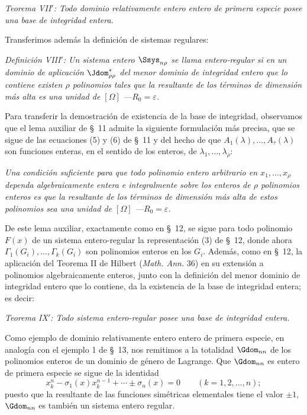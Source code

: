 \documentclass[11pt]{article}
\newcommand{\eps}{\varepsilon}
\begin{document}
\emph{Teorema VII$'$: Todo dominio relativamente entero entero de primera especie posee una base de integridad entera.}

Transferimos además la definición de sistemas regulares:

\emph{Definición VIII$'$: Un sistema entero $\Ssys_{n\rho}$ se llama entero-regular si en un dominio de aplicación $\Jdom^*_{\rho\rho}$ del menor dominio de integridad entero que lo contiene existen $\rho$ polinomios tales que la resultante de los términos de dimensión más alta es una unidad de $[\Omega]$ ---$R_0=\eps$.}

Para transferir la demostración de existencia de la base de integridad, observamos que el lema auxiliar de \S\ 11 admite la siguiente formulación más precisa, que se sigue de las ecuaciones (5) y (6) de \S\ 11 y del hecho de que $A_1(\lambda),\ldots,A_\tau(\lambda)$ son funciones enteras, en el sentido de los enteros, de $\lambda_1,\ldots,\lambda_\rho$:

\emph{Una condición suficiente para que todo polinomio entero arbitrario en $x_1,\ldots,x_\rho$ dependa algebraicamente entera e integralmente sobre los enteros de $\rho$ polinomios enteros es que la resultante de los términos de dimensión más alta de estos polinomios sea una unidad de $[\Omega]$ ---$R_0=\eps$.}

De este lema auxiliar, exactamente como en \S\ 12, se sigue para todo polinomio $F(x)$ de un sistema entero-regular la representación (3) de \S\ 12, donde ahora $\Gamma_1(G_i),\ldots,\Gamma_k(G_i)$ son polinomios enteros en los $G_i$. Además, como en \S\ 12, la aplicación del Teorema II de Hilbert (\emph{Math. Ann.} 36) en su extensión a polinomios algebraicamente enteros, junto con la definición del menor dominio de integridad entero que lo contiene, da la existencia de la base de integridad entera; es decir:

\emph{Teorema IX$'$: Todo sistema entero-regular posee una base de integridad entera.}

Como ejemplo de dominio relativamente entero entero de primera especie, en analogía con el ejemplo 1 de \S\ 13, nos remitimos a la totalidad $\Gdom_{nn}$ de los polinomios enteros de un dominio de género de Lagrange. Que $\Gdom_{nn}$ es entero de primera especie se sigue de la identidad
\[
  x_k^n-\sigma_1(x)x_k^{n-1}+\cdots\pm\sigma_n(x)=0
  \qquad(k=1,2,
\ldots,n);
\]
puesto que la resultante de las funciones simétricas elementales tiene el valor $\pm1$, $\Gdom_{nn}$ es también un sistema entero regular.
\end{document}
